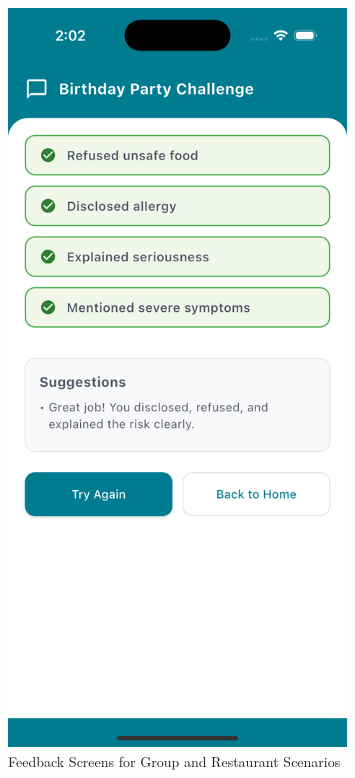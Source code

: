 \documentclass[MScCS]{uccthesis}
\begin{document}
\begin{figure}[htbp]
\begin{minipage}[b]{0.45\textwidth}
        \includegraphics[width=0.8\textwidth,height=0.45\textheight,keepaspectratio]{Figures/group_training_feedback_screen.png}
    \end{minipage}
     \caption{Feedback Screens for Group and Restaurant Scenarios}
     \label{fig:feedback-screen-screenshots}
    
\end{figure}
\end{document}
